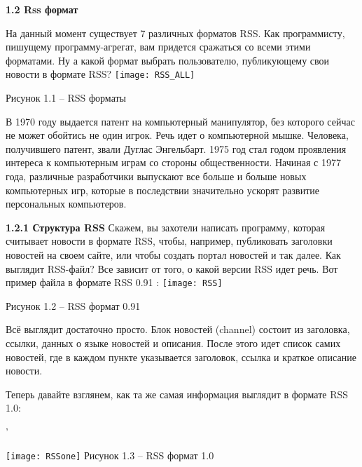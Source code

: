 \documentclass[14pt,a4paper]{extreport}
\begin{document}
	\textbf{1.2  Rss формат}\par
           \hspace{4ex}На данный момент существует 7 различных форматов RSS. Как программисту, пишущему программу-агрегат, вам придется сражаться со всеми этими форматами. Ну а какой формат выбрать пользователю, публикующему свои новости в формате RSS?
           \center \texttt{[image: RSS\_ALL]}\par
	\center Рисунок 1.1 – RSS форматы\par
\flushleft\parindent=1cm В 1970 году выдается патент на компьютерный манипулятор, без которого сейчас не может обойтись не один игрок. Речь идет о компьютерной мышке. Человека, получившего патент, звали Дуглас Энгельбарт. 1975 год стал годом проявления интереса к компьютерным играм со стороны общественности. Начиная с 1977 года, различные разработчики выпускают все больше и больше новых компьютерных игр, которые в последствии значительно ускорят развитие персональных компьютеров.\par
           
           \textbf{  1.2.1 Структура RSS}
\hspace{4ex}Скажем, вы захотели написать программу, которая считывает новости в формате RSS, чтобы, например, публиковать заголовки новостей на своем сайте, или чтобы создать портал новостей и так далее. Как выглядит RSS-файл? Все зависит от того, о какой версии RSS идет речь. Вот пример файла в формате RSS 0.91 :
           \center \texttt{[image: RSS]}\par   
           \center Рисунок 1.2 – RSS формат 0.91\par
           
	\flushleft\parindent=1cm Всё выглядит достаточно просто. Блок новостей (channel) состоит из заголовка, ссылки, данных о языке новостей и описания. После этого идет список самих новостей, где в каждом пункте указывается заголовок, ссылка и краткое описание новости.\par
Теперь давайте взглянем, как та же самая информация выглядит в формате RSS 1.0:\par'

	\texttt{[image: RSSone]}   
           \center Рисунок 1.3 – RSS формат 1.0\par
           
\end{document}
